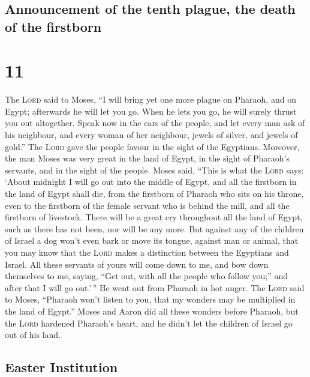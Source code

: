 \hypertarget{announcement-of-the-tenth-plague-the-death-of-the-firstborn}{%
\subsection{Announcement of the tenth plague, the death of the
firstborn}\label{announcement-of-the-tenth-plague-the-death-of-the-firstborn}}

\hypertarget{section-10}{%
\section{11}\label{section-10}}

 The \textsc{Lord} said to Moses, ``I will bring yet one
more plague on Pharaoh, and on Egypt; afterwards he will let you go.
When he lets you go, he will surely thrust you out altogether.
 Speak now in the ears of the people, and let every man
ask of his neighbour, and every woman of her neighbour, jewels of
silver, and jewels of gold.''  The \textsc{Lord} gave the
people favour in the sight of the Egyptians. Moreover, the man Moses was
very great in the land of Egypt, in the sight of Pharaoh's servants, and
in the sight of the people.  Moses said, ``This is what
the \textsc{Lord} says: `About midnight I will go out into the middle of
Egypt,  and all the firstborn in the land of Egypt shall
die, from the firstborn of Pharaoh who sits on his throne, even to the
firstborn of the female servant who is behind the mill, and all the
firstborn of livestock.  There will be a great cry
throughout all the land of Egypt, such as there has not been, nor will
be any more.  But against any of the children of Israel a
dog won't even bark or move its tongue, against man or animal, that you
may know that the \textsc{Lord} makes a distinction between the
Egyptians and Israel.  All these servants of yours will
come down to me, and bow down themselves to me, saying, ``Get out, with
all the people who follow you;'' and after that I will go out.'\,'' He
went out from Pharaoh in hot anger.  The \textsc{Lord}
said to Moses, ``Pharaoh won't listen to you, that my wonders may be
multiplied in the land of Egypt.''  Moses and Aaron did
all these wonders before Pharaoh, but the \textsc{Lord} hardened
Pharaoh's heart, and he didn't let the children of Israel go out of his
land.

\hypertarget{easter-institution}{%
\subsection{Easter Institution}\label{easter-institution}}

